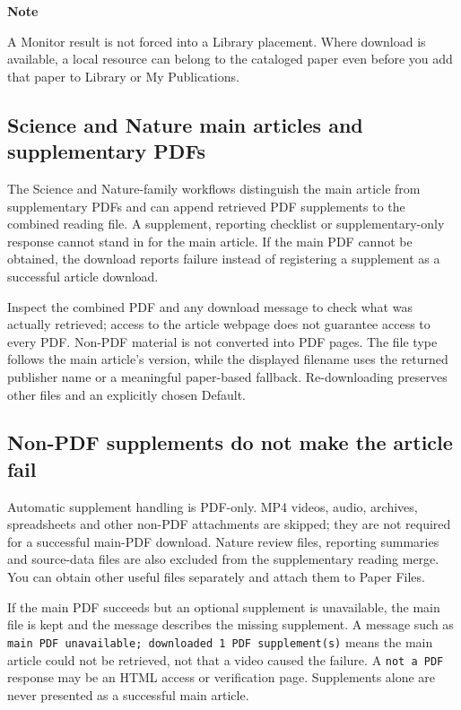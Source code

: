 \documentclass[10pt,letterpaper,oneside]{scrreprt}
\renewenvironment{quote}
  {\Needspace{5\baselineskip}\begin{tcolorbox}[enhanced,breakable,colback=GewuPale,colframe=GewuPale,boxrule=0pt,
    borderline west={1.6pt}{0pt}{GewuBlue},arc=1.2mm,left=2.5mm,right=2.5mm,top=1.7mm,bottom=1.7mm,
    before skip=4pt,after skip=5pt,fontupper=\color{GewuInk}\small]}
  {\end{tcolorbox}}
\begin{document}
\begin{quote}
\textbf{Note}

A Monitor result is not forced into a Library placement. Where download is available, a local resource can belong to the cataloged paper even before you add that paper to Library or My Publications.
\end{quote}

\subsection{Science and Nature main articles and supplementary PDFs}\label{science-and-nature-main-articles-and-supplementary-pdfs}

The Science and Nature-family workflows distinguish the main article from supplementary PDFs and can append retrieved PDF supplements to the combined reading file. A supplement, reporting checklist or supplementary-only response cannot stand in for the main article. If the main PDF cannot be obtained, the download reports failure instead of registering a supplement as a successful article download.

Inspect the combined PDF and any download message to check what was actually retrieved; access to the article webpage does not guarantee access to every PDF. Non-PDF material is not converted into PDF pages. The file type follows the main article's version, while the displayed filename uses the returned publisher name or a meaningful paper-based fallback. Re-downloading preserves other files and an explicitly chosen Default.

\subsection{Non-PDF supplements do not make the article fail}\label{non-pdf-supplements-do-not-make-the-article-fail}

Automatic supplement handling is PDF-only. MP4 videos, audio, archives, spreadsheets and other non-PDF attachments are skipped; they are not required for a successful main-PDF download. Nature review files, reporting summaries and source-data files are also excluded from the supplementary reading merge. You can obtain other useful files separately and attach them to Paper Files.

If the main PDF succeeds but an optional supplement is unavailable, the main file is kept and the message describes the missing supplement. A message such as \texttt{main\ PDF\ unavailable;\ downloaded\ 1\ PDF\ supplement(s)} means the main article could not be retrieved, not that a video caused the failure. A \texttt{not\ a\ PDF} response may be an HTML access or verification page. Supplements alone are never presented as a successful main article.
\end{document}
